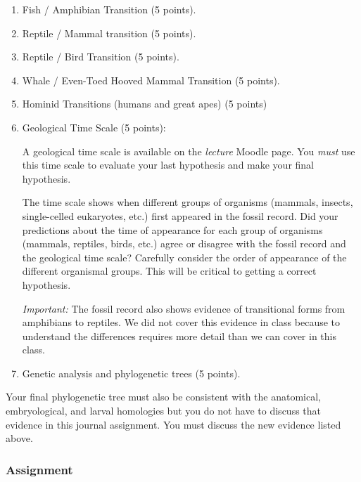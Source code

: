 \documentclass[12pt]{exam}
\begin{document}
\begin{enumerate}

	\item Fish / Amphibian Transition (5 points).

	\item Reptile / Mammal transition (5 points).
	
	\item Reptile / Bird Transition (5 points).

	\item Whale / Even-Toed Hooved Mammal Transition (5 points).

	\item Hominid Transitions (humans and great apes) (5 points)

	\item Geological Time Scale (5 points): 
	
	A geological time scale is available on the \emph{lecture}
	Moodle page. You \emph{must} use this time scale to evaluate your 
	last hypothesis and make your final hypothesis. 
	
	The time scale shows when different groups of 
	organisms (mammals, insects, single-celled eukaryotes, etc.)
	first appeared in the fossil record. Did your predictions about the time of
	appearance for each group of organisms (mammals, reptiles, birds, etc.)
	agree or disagree with the fossil record and the geological time scale? 
	Carefully consider the order of appearance of the different organismal 
	groups. This will be critical to getting a correct hypothesis. 
  
	\emph{Important:} The fossil record also shows evidence of transitional 
	forms from amphibians to reptiles. We did not cover this evidence in class 
	because to understand the differences requires more detail than we can cover in this class. 

	\item Genetic analysis and phylogenetic trees (5 points).
	
\end{enumerate}

Your final phylogenetic tree must also be consistent with the 
anatomical, embryological, and larval homologies but you do not have to discuss
that evidence in this journal assignment. You must discuss the new evidence listed above.

\subsubsection*{Assignment}
\end{document}

